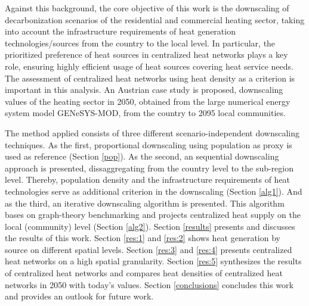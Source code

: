 Against this background, the core objective of this work is the downscaling of decarbonization scenarios of the residential and commercial heating sector, taking into account the infrastructure requirements of heat generation technologies/sources from the country to the local level. In particular, the prioritized preference of heat sources in centralized heat networks plays a key role, ensuring highly efficient usage of heat sources covering heat service needs. The assessment of centralized heat networks using heat density as a criterion is important in this analysis. An Austrian case study is proposed, downscaling values of the heating sector in 2050, obtained from the large numerical energy system model GENeSYS-MOD, from the country to 2095 local communities.\vspace{0.3cm}

The method applied consists of three different scenario-independent downscaling techniques. As the first, proportional downscaling using population as proxy is used as reference (Section \ref{pop}). As the second, an sequential downscaling approach is presented, dissaggregating from the country level to the sub-region level. Thereby, population density and the infrastructure requirements of heat technologies serve as additional criterion in the downscaling (Section \ref{alg1}). And as the third, an iterative downscaling algorithm is presented. This algorithm bases on graph-theory benchmarking and projects centralized heat supply on the local (community) level (Section \ref{alg2}). Section \ref{results} presents and discusses the results of this work. Section \ref{res:1} and \ref{res:2} shows heat generation by source on different spatial levels. Section \ref{res:3} and \ref{res:4} presents centralized heat networks on a high spatial granularity. Section \ref{res:5} synthesizes the results of centralized heat networks and compares heat densities of centralized heat networks in 2050 with today's values. Section \ref{conclusions} concludes this work and provides an outlook for future work. 
